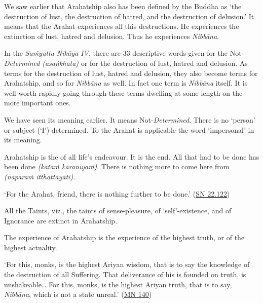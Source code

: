 We saw earlier that Arahatship also has been defined by the Buddha as `the destruction of lust, the destruction of hatred, and the destruction of delusion.' It means that the Arahat experiences all this destructions. He experiences the extinction of lust, hatred and delusion. Thus he experiences \emph{Nibbāna}.

In the \emph{Saṁyutta Nikāya IV}, there are 33 descriptive words given for the Not-\emph{Determined} \emph{(asaṅkhata)} or for the destruction of lust, hatred and delusion. As terms for the destruction of lust, hatred and delusion, they also become terms for Arahatship, and so for \emph{Nibbāna} as well. In fact one term is \emph{Nibbāna} itself. It is well worth rapidly going through these terms dwelling at some length on the more important ones.


We have seen its meaning earlier. It means Not-\emph{Determined}. There is no `person' or subject (`I') determined. To the Arahat  is applicable the word `impersonal' in its  meaning.


Arahatship is the  of all life's endeavour. It is the end. All that had to be done has been done \emph{(kataṁ karanīyaṁ)}. There is nothing more to come here from \emph{(nāparaṁ itthattāyāti)}.

`For the Arahat, friend, there is nothing further to be done.' (\href{https://suttacentral.net/sn22.122/en/suddhaso}{SN 22.122})


All the Taints, viz., the taints of sense-pleasure, of `self'-existence, and of Ignorance are extinct in Arahatship.


The experience of Arahatship is the experience of the highest truth, or of the highest actuality.

`For this, monks, is the highest Ariyan wisdom, that is to say the knowledge of the destruction of all Suffering. That deliverance of his is founded on truth, is unshakeable\ldots\hspace{0pt} For this, monks, is the highest Ariyan truth, that is to say, \emph{Nibbāna}, which is not a state unreal.' (\href{https://suttacentral.net/mn140/en/bodhi}{MN 140})

